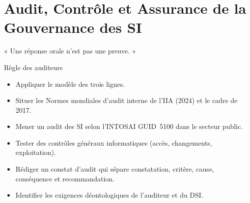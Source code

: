 
\chapter{Audit, Contrôle et Assurance de la Gouvernance des SI}
\label{chap:audit}

\epigraph{%
    « Une réponse orale n'est pas une preuve. »%
}{Règle des auditeurs}


\begin{boxobjectifs}
\begin{itemize}
    \item Appliquer le modèle des trois lignes.
    \item Situer les Normes mondiales d'audit interne de l'IIA (2024) et le
          cadre de 2017.
    \item Mener un audit des SI selon l'INTOSAI GUID~5100 dans le secteur
          public.
    \item Tester des contrôles généraux informatiques (accès, changements,
          exploitation).
    \item Rédiger un constat d'audit qui sépare constatation, critère,
          cause, conséquence et recommandation.
    \item Identifier les exigences déontologiques de l'auditeur et du DSI.
\end{itemize}
\end{boxobjectifs}

